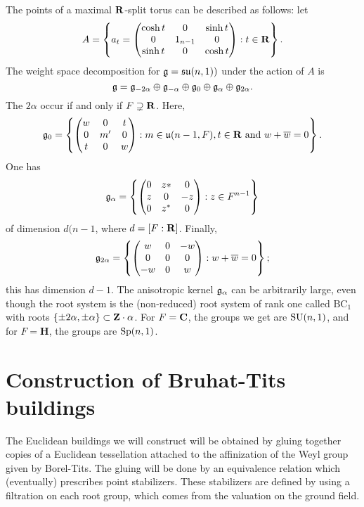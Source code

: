 \documentclass{article}
\begin{document}
The points of a maximal $\mathbf{R}$-split torus can be described as follows: let 
\[
  A = \left\{a_t = \begin{pmatrix} \cosh t & 0 & \sinh t \\0 & 1_{n-1} & 0\\ \sinh t & 0& \cosh t \end{pmatrix} : t\in \mathbf{R}\right\} .
\]
The weight space decomposition for $\mathfrak{g}=\mathfrak{su}(n,1))$ under the action 
of $A$ is 
\[
  \mathfrak{g} = \mathfrak{g}_{-2\alpha} \oplus \mathfrak{g}_{-\alpha} \oplus \mathfrak{g}_0 \oplus \mathfrak{g}_\alpha \oplus \mathfrak{g}_{2\alpha} .
\]
The $2\alpha$ occur if and only if $F\supsetneq \mathbf{R}$. Here, 
\[
  \mathfrak{g}_0 = \left\{\begin{pmatrix} w & 0 & t \\ 0 & m'& 0 \\ t & 0 & w \end{pmatrix}:m\in \mathfrak{u}(n-1,F),t\in \mathbf{R}\text{ and }w+\overline w=0\right\} .
\]
One has 
\[
  \mathfrak{g}_\alpha = \left\{\begin{pmatrix} 0 & z\ast & 0 \\ z & 0 & -z \\ 0 & z^\ast & 0 \end{pmatrix} :z\in F^{n-1} \right\} 
\]
of dimension $d(n-1$, where $d=[F:\mathbf{R}]$. Finally, 
\[
  \mathfrak{g}_{2\alpha} = \left\{\begin{pmatrix} w & 0 & -w \\ 0 & 0 & 0 \\ -w & 0 & w \end{pmatrix} : w+\overline w =0\right\} ;
\]
this has dimension $d-1$. The anisotropic kernel $\mathfrak{g}_\alpha$ can be arbitrarily 
large, even though the root system is the (non-reduced) root system of rank 
one called $\mathrm{BC}_1$ with roots 
$\{\pm 2\alpha,\pm \alpha\}\subset \mathbf{Z}\cdot \alpha$. For 
$F=\mathbf{C}$, the groups we get are $\operatorname{SU}(n,1)$, and for 
$F=\mathbf H$, the groups are $\operatorname{Sp}(n,1)$. 





\section{Construction of Bruhat-Tits buildings}

The Euclidean buildings we will construct will be obtained by gluing together 
copies of a Euclidean tessellation attached to the affinization of the Weyl 
group given by Borel-Tits. The gluing will be done by an equivalence relation 
which (eventually) prescribes point stabilizers. These stabilizers are defined 
by using a filtration on each root group, which comes from the valuation on the 
ground field. 
\end{document}
